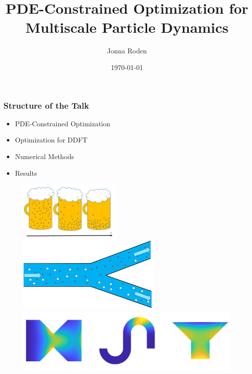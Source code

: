 \documentclass[aspectratio=169,xcolor=dvipsnames]{beamer}
\begin{document}
\title[]{PDE-Constrained Optimization for Multiscale Particle Dynamics}
\author[Jonna Roden]{Jonna Roden}
\date{\today}

\begin{frame}
\titlepage
\end{frame}
 
 
\begin{frame}
	\frametitle{Structure of the Talk}
	 
	 \begin{itemize}
	 	\item PDE-Constrained Optimization
	 	\item Optimization for DDFT
	 	\item Numerical Methods 
	 	\item Results
	 \end{itemize}
\end{frame}

\begin{frame}
		\begin{figure}
			\includegraphics[width=5cm]{beer.png}
			\includegraphics[width=7cm]{Microfilter.png}
			\includegraphics[width=12cm]{Future.png}
		\end{figure}
		
\end{frame}
\end{document}

